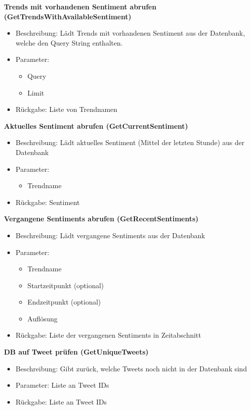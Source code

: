 \documentclass[conference]{IEEEtran}
\begin{document}
\textbf{Trends mit vorhandenen Sentiment abrufen (GetTrendsWithAvailableSentiment)}
\begin{itemize}
    \item Beschreibung: Lädt Trends mit vorhandenen Sentiment aus der Datenbank, welche den Query String enthalten.
    \item Parameter:
          \begin{itemize}
              \item Query
              \item Limit
          \end{itemize}
    \item Rückgabe: Liste von Trendnamen
\end{itemize}

\smallskip
\textbf{Aktuelles Sentiment abrufen (GetCurrentSentiment)}
\begin{itemize}
    \item Beschreibung: Lädt aktuelles Sentiment (Mittel der letzten Stunde) aus der Datenbank
    \item Parameter:
          \begin{itemize}
              \item Trendname
          \end{itemize}
    \item Rückgabe: Sentiment
\end{itemize}

\smallskip
\textbf{Vergangene Sentiments abrufen (GetRecentSentiments)}
\begin{itemize}
    \item Beschreibung: Lädt vergangene Sentiments aus der Datenbank
    \item Parameter:
          \begin{itemize}
              \item Trendname
              \item Startzeitpunkt (optional)
              \item Endzeitpunkt (optional)
              \item Auflösung
          \end{itemize}
    \item Rückgabe: Liste der vergangenen Sentiments in Zeitabschnitt
\end{itemize}

\smallskip
\textbf{DB auf Tweet prüfen (GetUniqueTweets)}
\begin{itemize}
    \item Beschreibung: Gibt zurück, welche Tweets noch nicht in der Datenbank sind
    \item Parameter: Liste an Tweet IDs
    \item Rückgabe: Liste an Tweet IDs
\end{itemize}
\end{document}
